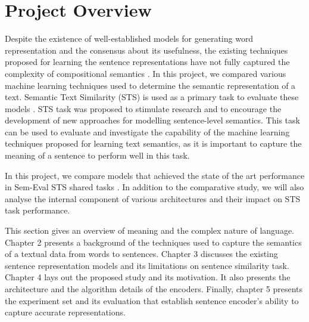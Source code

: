 \documentclass[12pt]{report} %
\begin{document}
	
	
	\section{Project Overview}
	Despite the existence of well-established models for generating word representation and the consensus about its usefulness, the existing techniques proposed for learning the sentence representations have not fully captured the complexity of compositional semantics \citep{conneau2017supervised}. In this project, we compared various machine learning techniques used to determine the semantic representation of a text. Semantic Text Similarity (STS) is used as a primary task to evaluate these models  \citep{agirre2012semeval}. STS task was proposed to stimulate research and to encourage the development of new approaches for modelling sentence-level semantics. %
	This task can be used to evaluate and investigate the capability of the machine learning techniques proposed for learning text semantics, as it is important to capture the meaning of a sentence to perform well in this task.
	
	
	In this project, we compare models that achieved the state of the art performance in Sem-Eval STS shared tasks \citep{cer2017semeval}.  In addition to the comparative study, we will also analyse the internal component of various architectures and their impact on STS task performance.
	
	This section gives an overview of meaning and the complex nature of language. Chapter 2 presents a background of the techniques used to capture the semantics of a textual data from words to sentences. Chapter 3 discusses the existing sentence representation models and its limitations on sentence similarity task. Chapter 4  lays out the proposed study and its motivation. It also presents the architecture and the algorithm details of the encoders. Finally, chapter 5 presents the experiment set and its evaluation that establish sentence encoder's ability to capture accurate representations.
	
\end{document}
